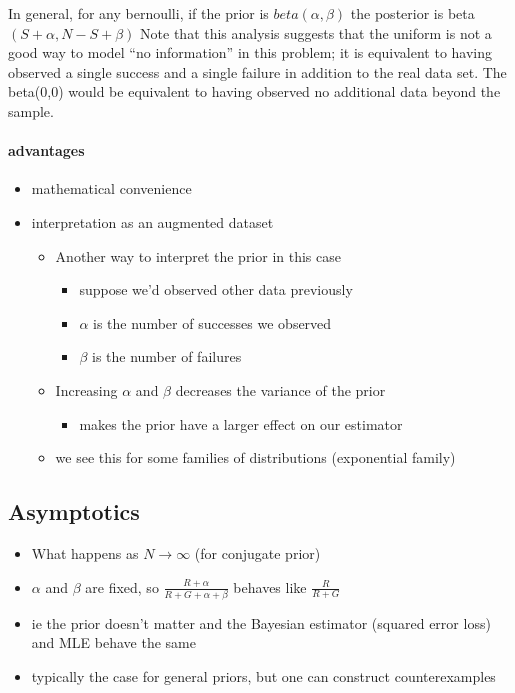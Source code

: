 \begin{itemize}
  In general, for any bernoulli, if the prior is $beta(\alpha,\beta)$ the
  posterior is beta$(S + \alpha, N - S + \beta)$ Note that this analysis
  suggests that the uniform is not a good way to model ``no
  information'' in this problem; it is equivalent to having observed a
  single success and a single failure in addition to the real data
  set.  The beta(0,0) would be equivalent to having observed no
  additional data beyond the sample.
\end{itemize}

\paragraph{advantages}
\begin{itemize}
\item mathematical convenience
\item interpretation as an augmented dataset
\begin{itemize}
\item Another way to interpret the prior in this case
\begin{itemize}
\item suppose we'd observed other data previously
\item $\alpha$ is the number of successes we observed
\item $\beta$ is the number of failures
\end{itemize}
\item Increasing $\alpha$ and $\beta$ decreases the variance of the prior
\begin{itemize}
\item makes the prior have a larger effect on our estimator
\end{itemize}
\item we see this for some families of distributions (exponential family)
\end{itemize}
\end{itemize}

\subsection{Asymptotics}

\begin{itemize}
\item What happens as $N \to \infty$ (for conjugate prior)
\item $\alpha$ and $\beta$ are fixed, so $\frac{R + \alpha}{R + G + \alpha + \beta}$ behaves
  like $\frac{R}{R+G}$
\item ie the prior doesn't matter and the Bayesian estimator
       (squared error loss) and MLE behave the same
\item typically the case for general priors, but one can construct
       counterexamples
\end{itemize}

